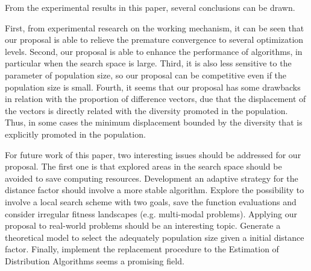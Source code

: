 From the experimental results in this paper, several conclusions can be drawn.
%

First, from experimental research on the working mechanism, it can be seen that our proposal is able to relieve the premature convergence to several optimization levels.
%
Second, our proposal is able to enhance the performance of \DE{} algorithms, in particular when the search space is large.
%
Third, it is also less sensitive to the parameter of population size, so our proposal can be competitive even if the population size is small.
%
Fourth, it seems that our proposal has some drawbacks in relation with the proportion of difference vectors, due that the displacement of the vectors is directly related with the diversity promoted in the population.
%
Thus, in some cases the minimum displacement bounded by the diversity that is explicitly promoted in the population.


For future work of this paper, two interesting issues should be addressed for our proposal.
%
The first one is that explored areas in the search space should be avoided to save computing resources.
%
Development an adaptive strategy for the distance factor should involve a more stable algorithm.
%
Explore the possibility to involve a local search scheme with two goals, save the function evaluations and consider irregular fitness landscapes (e.g. multi-modal problems).
%
Applying our proposal to real-world problems should be an interesting topic.
%
%
Generate a theoretical model to select the adequately population size given a initial distance factor.
%
Finally, implement the replacement procedure to the Estimation of Distribution Algorithms seems a promising field.
